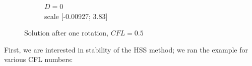 \documentclass[mathserif]{beamer}
\begin{document}
\begin{frame}
\begin{figure}[H]
\begin{subfigure}[H]{0.3\textwidth}
		\vspace{-3mm}
		\caption{$D = 0$\\\vspace{-2mm}scale [-0.00927; 3.83]}
	\end{subfigure}
	\vspace{-3mm}
	\caption{Solution after one rotation, $CFL = 0.5$}	
\end{figure}

\end{frame}



\begin{frame}
First, we are interested in stability of the HSS method; we ran the example for various CFL numbers:
\begin{figure}[H]
\centering
	\begin{subfigure}[H]{0.02\textwidth}

\end{subfigure}
\end{figure}
\end{frame}
\end{document}
